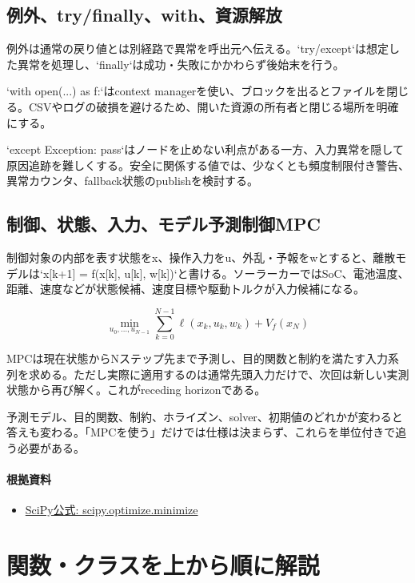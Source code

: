 \documentclass[a4paper,11pt]{article}
\begin{document}
\subsection{例外、try/finally、with、資源解放}
例外は通常の戻り値とは別経路で異常を呼出元へ伝える。`try/except`は想定した異常を処理し、`finally`は成功・失敗にかかわらず後始末を行う。


`with open(...) as f:`はcontext managerを使い、ブロックを出るとファイルを閉じる。CSVやログの破損を避けるため、開いた資源の所有者と閉じる場所を明確にする。


`except Exception: pass`はノードを止めない利点がある一方、入力異常を隠して原因追跡を難しくする。安全に関係する値では、少なくとも頻度制限付き警告、異常カウンタ、fallback状態のpublishを検討する。



\subsection{制御、状態、入力、モデル予測制御MPC}
制御対象の内部を表す状態をx、操作入力をu、外乱・予報をwとすると、離散モデルは`x[k+1] = f(x[k], u[k], w[k])`と書ける。ソーラーカーではSoC、電池温度、距離、速度などが状態候補、速度目標や駆動トルクが入力候補になる。


\[
\min_{u_0,\ldots,u_{N-1}} \sum_{k=0}^{N-1}\ell(x_k,u_k,w_k)+V_f(x_N)
\]

MPCは現在状態からNステップ先まで予測し、目的関数と制約を満たす入力系列を求める。ただし実際に適用するのは通常先頭入力だけで、次回は新しい実測状態から再び解く。これがreceding horizonである。


予測モデル、目的関数、制約、ホライズン、solver、初期値のどれかが変わると答えも変わる。「MPCを使う」だけでは仕様は決まらず、これらを単位付きで追う必要がある。

\paragraph{根拠資料}
\begin{itemize}[leftmargin=1.6em]
\item \href{https://docs.scipy.org/doc/scipy/reference/generated/scipy.optimize.minimize.html}{SciPy公式: scipy.optimize.minimize}
\end{itemize}



        \section{関数・クラスを上から順に解説}
\end{document}
